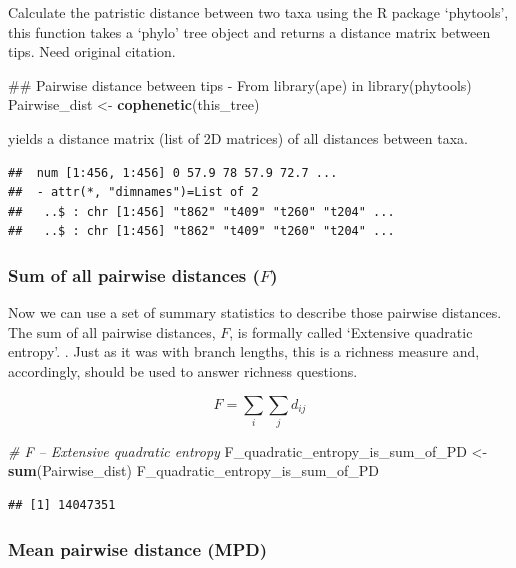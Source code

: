 \documentclass[]{book}
\newenvironment{Shaded}{\begin{snugshade}}{\end{snugshade}}
\newcommand{\KeywordTok}[1]{\textcolor[rgb]{0.13,0.29,0.53}{\textbf{{#1}}}}
\newcommand{\StringTok}[1]{\textcolor[rgb]{0.31,0.60,0.02}{{#1}}}
\newcommand{\CommentTok}[1]{\textcolor[rgb]{0.56,0.35,0.01}{\textit{{#1}}}}
\newcommand{\NormalTok}[1]{{#1}}
\theoremstyle{definition}
\theoremstyle{definition}
\theoremstyle{remark}
\begin{document}
Calculate the patristic distance between two taxa using the R package
`phytools', this function takes a `phylo' tree object and returns a
distance matrix between tips. Need original citation.

\begin{Shaded}
\begin{Highlighting}[]
\NormalTok{## Pairwise distance between tips - From library(ape) in library(phytools)}
\NormalTok{Pairwise_dist <-}\StringTok{ }\KeywordTok{cophenetic}\NormalTok{(this_tree)}
\end{Highlighting}
\end{Shaded}

yields a distance matrix (list of 2D matrices) of all distances between
taxa.

\begin{verbatim}
##  num [1:456, 1:456] 0 57.9 78 57.9 72.7 ...
##  - attr(*, "dimnames")=List of 2
##   ..$ : chr [1:456] "t862" "t409" "t260" "t204" ...
##   ..$ : chr [1:456] "t862" "t409" "t260" "t204" ...
\end{verbatim}

\subsubsection{\texorpdfstring{Sum of all pairwise distances
(\(F\))}{Sum of all pairwise distances (F)}}\label{sum-of-all-pairwise-distances-f}

Now we can use a set of summary statistics to describe those pairwise
distances. The sum of all pairwise distances, \(F\), is formally called
`Extensive quadratic entropy'. \citep{Izsak2000}. Just as it was with
branch lengths, this is a richness measure and, accordingly, should be
used to answer richness questions.

\[F = \sum_{i} \sum_{j} d_{ij}\]

\begin{Shaded}
\begin{Highlighting}[]
\CommentTok{# F -- Extensive quadratic entropy}
\NormalTok{F_quadratic_entropy_is_sum_of_PD <-}\StringTok{ }\KeywordTok{sum}\NormalTok{(Pairwise_dist)}
\NormalTok{F_quadratic_entropy_is_sum_of_PD}
\end{Highlighting}
\end{Shaded}

\begin{verbatim}
## [1] 14047351
\end{verbatim}

\subsubsection{Mean pairwise distance
(MPD)}\label{mean-pairwise-distance-mpd}
\end{document}
